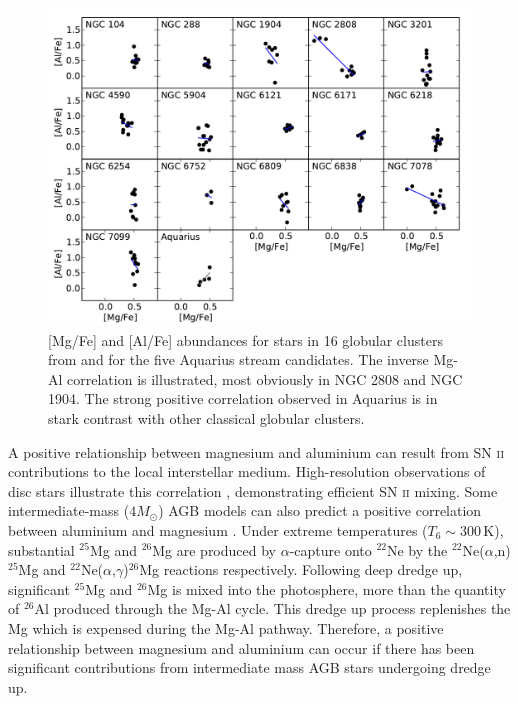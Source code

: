 \documentclass{emulateapj}
\begin{document}
\begin{figure}[t!]
	\includegraphics[width=\textwidth]{./figures/aquarius-mg-al-cluster.pdf}
	\caption{[Mg/Fe] and [Al/Fe] abundances for stars in 16 globular clusters from \citet{carretta;et-al_2009} and for the five Aquarius stream candidates. The inverse Mg-Al correlation is illustrated, most obviously in NGC 2808 and NGC 1904. The strong positive correlation observed in Aquarius is in stark contrast with other classical globular clusters.}
	\label{fig:mg-al}
\end{figure}


A positive relationship between magnesium and aluminium can result from SN \textsc{ii} contributions to the local interstellar medium. High-resolution observations of disc stars illustrate this correlation \citep{bensby;venn}, demonstrating efficient SN \textsc{ii} mixing. Some intermediate-mass ($4M_\odot$) AGB models can also predict a positive correlation between aluminium and magnesium \citet{karakas;et-al}. Under extreme temperatures ($T_6 \sim 300$\,K), substantial $^{25}$Mg and $^{26}$Mg are produced by $\alpha$-capture onto $^{22}$Ne by the $^{22}$Ne($\alpha$,n)$^{25}$Mg and $^{22}$Ne($\alpha$,$\gamma$)$^{26}$Mg reactions respectively. Following deep dredge up, significant $^{25}$Mg and $^{26}$Mg is mixed into the photosphere, more than the quantity of $^{26}$Al produced through the Mg-Al cycle. This dredge up process replenishes the Mg which is expensed during the Mg-Al pathway. Therefore, a positive relationship between magnesium and aluminium can occur if there has been significant contributions from intermediate mass AGB stars undergoing dredge up. 
\end{document}
